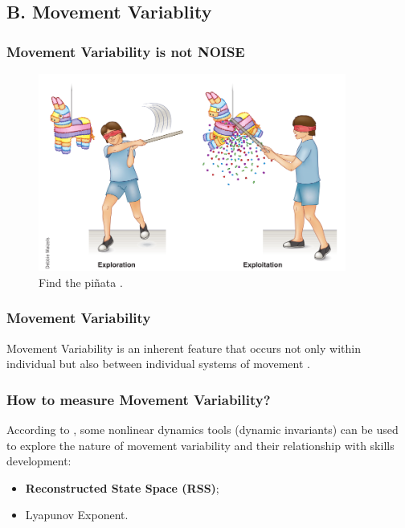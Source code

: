 \documentclass{beamer}
\begin{document}
\subsection{B. Movement Variablity}

\begin{frame}
  \frametitle{Movement Variability is not NOISE}

\vspace{-1cm}
\begin{figure}
\includegraphics[width=0.9\textwidth]{herzfelt2014_fig1}
\centering
\caption{Find the pi\~nata \textcolor{red}{\textbf{  \cite{Herzfeld2014}   }}.}
 \end{figure}

\end{frame}




\begin{frame}
\frametitle{Movement Variability}

Movement Variability is an inherent feature that occurs not only within individual
but also between individual systems of movement  \textcolor{red}{\textbf{ \cite{newell1993variability}   }}.

\end{frame}




\begin{frame}
\frametitle{How to measure Movement Variability?}


According to \textcolor{red}{\textbf{\cite{Preatoni2013}}},
some nonlinear dynamics tools (dynamic invariants) can be used to explore the
nature of movement variability and their relationship with skills development:
\begin{itemize}
    \item \textbf{Reconstructed State Space (RSS)};
    \item Lyapunov Exponent.
\end{itemize}


\end{frame}
\end{document}
